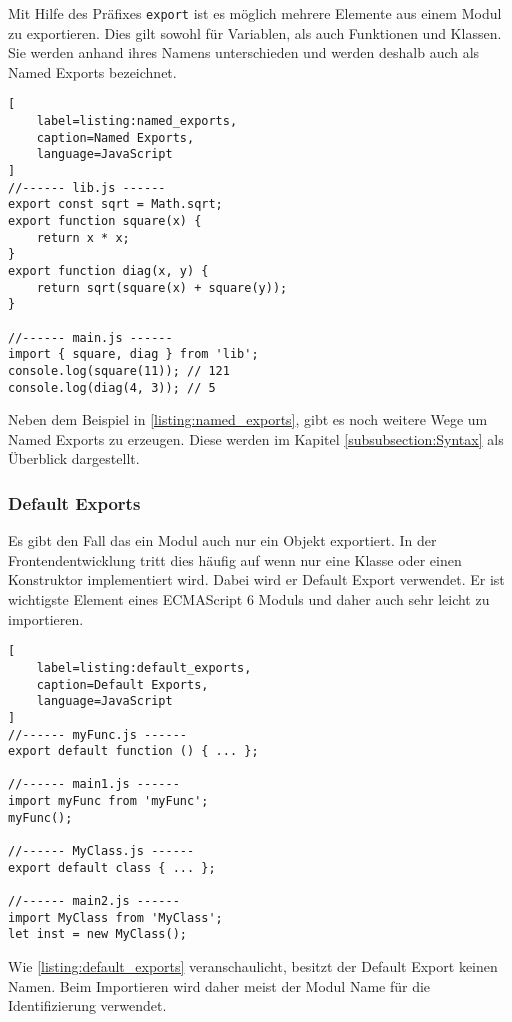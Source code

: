 Mit Hilfe des Präfixes \lstinline{export} ist es möglich mehrere Elemente aus einem Modul zu exportieren. Dies gilt sowohl für Variablen, als auch Funktionen und Klassen. Sie werden anhand ihres Namens unterschieden und werden deshalb auch als Named Exports bezeichnet. \autocite{AxelRauschmayer}

\begin{lstlisting}[
    label=listing:named_exports,
	caption=Named Exports,
	language=JavaScript
]
//------ lib.js ------
export const sqrt = Math.sqrt;
export function square(x) {
    return x * x;
}
export function diag(x, y) {
    return sqrt(square(x) + square(y));
}

//------ main.js ------
import { square, diag } from 'lib';
console.log(square(11)); // 121
console.log(diag(4, 3)); // 5
\end{lstlisting}

Neben dem Beispiel in \ref{listing:named_exports}, gibt es noch weitere Wege um Named Exports zu erzeugen. Diese werden im Kapitel \ref{subsubsection:Syntax} als Überblick dargestellt.

\subsubsection{Default Exports}
\label{subsubsection:default_exports}

Es gibt den Fall das ein Modul auch nur ein Objekt exportiert. In der Frontendentwicklung tritt dies häufig auf wenn nur eine Klasse oder einen Konstruktor implementiert wird. Dabei wird er Default Export verwendet. Er ist wichtigste Element eines ECMAScript 6 Moduls und daher auch sehr leicht zu importieren. \autocite{AxelRauschmayer}

\begin{lstlisting}[
    label=listing:default_exports,
	caption=Default Exports,
	language=JavaScript
]
//------ myFunc.js ------
export default function () { ... };

//------ main1.js ------
import myFunc from 'myFunc';
myFunc();

//------ MyClass.js ------
export default class { ... };

//------ main2.js ------
import MyClass from 'MyClass';
let inst = new MyClass();
\end{lstlisting}

Wie \ref{listing:default_exports} veranschaulicht, besitzt der Default Export keinen Namen. Beim Importieren wird daher meist der Modul Name für die Identifizierung verwendet.

